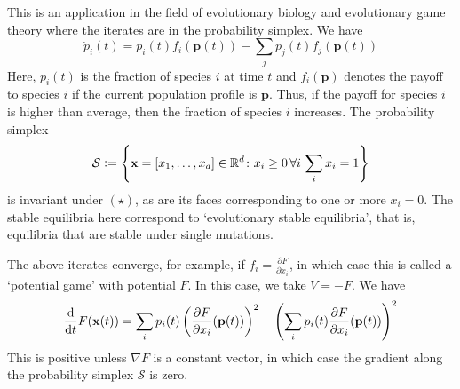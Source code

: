 This is an application in the field of evolutionary biology and evolutionary game theory where the iterates are in the probability simplex. We have
\begin{equation*}
    \dot{p}_i(t) = p_i(t) f_i(\mathbf{p}(t)) - \sum_{j} p_j(t) f_j(\mathbf{p}(t)) \tag{$\star$}
\end{equation*}
Here, $p_i(t)$ is the fraction of species $i$ at time $t$ and $f_i(\mathbf{p})$ denotes the payoff to species $i$ if the current population profile is $\mathbf{p}$. Thus, if the payoff for species $i$ is higher than average, then the fraction of species $i$ increases. The probability simplex
\[
    \mathcal{S} \vcentcolon= \left\{ \mathbf{x} = [x_1, \ldots, x_d] \in \mathbb{R}^d \colon x_i \geq 0 \, \forall i \,  \sum_ix_i = 1 \right\}
\]
is invariant under $(\star)$, as are its faces corresponding to one or more $x_i = 0$. The stable equilibria here correspond to `evolutionary stable equilibria', that is, equilibria that are stable under single mutations. 

The above iterates converge, for example, if $f_i = \frac{\partial F}{\partial x_i}$, in which case this is called a `potential game' with potential $F$. In this case, we take $V = -F$. We have
\[
    \frac{\mathrm{d}}{\mathrm{d} t} F(\mathbf{x}(t)) = \sum_i p_i(t) \left( \frac{\partial F}{\partial x_i}(\mathbf{p}(t)) \right)^2 - \left( \sum_i p_i(t) \frac{\partial F}{\partial x_i}(\mathbf{p}(t)) \right)^2
\]
This is positive unless $\nabla F$ is a constant vector, in which case the gradient along the probability simplex $\mathcal{S}$ is zero. 